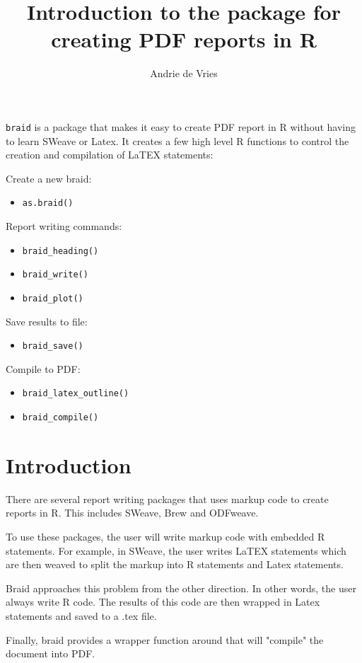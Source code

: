 \documentclass[a4paper]{article}
\title{Introduction to the \braid{} package for creating PDF reports in R}
\author{Andrie de Vries}
\newcommand{\braid}{{\tt braid}}
\newcommand{\code}[1]{{\tt #1}}
\begin{document}
\maketitle

\braid{} is a package that makes it easy to create PDF report in R without having to learn SWeave or Latex.  It creates a few high level R functions to control the creation and compilation of LaTEX statements:

Create a new braid: 
\begin{itemize}
	\item \code{as.braid()}
\end{itemize}

Report writing commands:
\begin{itemize}
	\item \code{braid\_heading()}
	\item \code{braid\_write()}
	\item \code{braid\_plot()}
\end{itemize}

Save results to file:
\begin{itemize}
	\item \code{braid\_save()}
\end{itemize}

Compile to PDF:
\begin{itemize}
	\item \code{braid\_latex\_outline()}
	\item \code{braid\_compile()}
\end{itemize}
	

\section{Introduction}

There are several report writing packages that uses markup code to create reports in R.  This includes SWeave, Brew and ODFweave.

To use these packages, the user will write markup code with embedded R statements.  For example, in SWeave, the user writes LaTEX statements which are then weaved to split the markup into R statements and Latex statements.

Braid approaches this problem from the other direction.  In other words, the user always write R code.  The results of this code are then wrapped in Latex statements and saved to a .tex file.

Finally, braid provides a wrapper function around \code{} that will "compile" the document into PDF.
\end{document}

